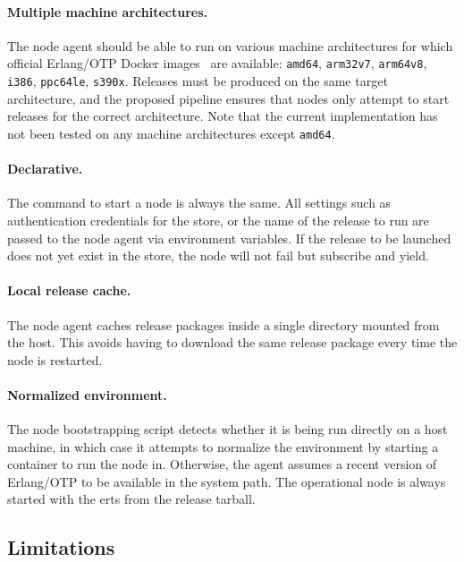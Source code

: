 \paragraph{Multiple machine architectures.} The node agent should be able to run on various machine architectures for which official Erlang/OTP Docker images~\cite{docker:erlang} are available: \lstinline|amd64|, \lstinline|arm32v7|, \lstinline|arm64v8|, \lstinline|i386|, \lstinline|ppc64le|, \lstinline|s390x|.
Releases must be produced on the same target architecture, and the proposed pipeline ensures that nodes only attempt to start releases for the correct architecture. Note that the current implementation has not been tested on any machine architectures except \lstinline|amd64|.

\paragraph{Declarative.} The command to start a node is always the same. All settings such as authentication credentials for the store, or the name of the release to run are passed to the node agent via environment variables. If the release to be launched does not yet exist in the store, the node will not fail but subscribe and yield.

\paragraph{Local release cache.} The node agent caches release packages inside a single directory mounted from the host. This avoids having to download the same release package every time the node is restarted.

\paragraph{Normalized environment.} The node bootstrapping script detects whether it is being run directly on a host machine, in which case it attempts to normalize the environment by starting a container to run the node in. Otherwise, the agent assumes a recent version of Erlang/OTP to be available in the system path. The operational node is always started with the \acrshort{erts} from the release tarball.


\cleardoublepage
\subsection{Limitations}

